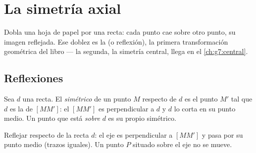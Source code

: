 \chapter{La simetría axial}\label{ch:g6:symmetry}

Dobla una hoja de papel por una recta: cada punto cae sobre otro punto,
su imagen reflejada. Ese doblez es la \emph{} (o
reflexión), la primera transformación geométrica del libro --- la
segunda, la simetría central, llega en el \cref{ch:g7:central}.

\section{Reflexiones}

\begin{definition}\label{def:g6:symmetry:def}
Sea $d$ una recta. El \emph{simétrico} de un
punto $M$ respecto de $d$ es el punto $M'$ tal que $d$ es la
 de $[MM']$: el  $[MM']$ es perpendicular
a $d$ y $d$ lo corta en su punto medio. Un punto que está \emph{sobre} $d$ es su
propio simétrico.
\end{definition}

\begin{omfigure}

{\small Reflejar respecto de la recta $d$: el eje es perpendicular a
$[MM']$ y pasa por su punto medio (trazos iguales). Un punto $P$
situado sobre el eje no se mueve.}
\end{omfigure}


